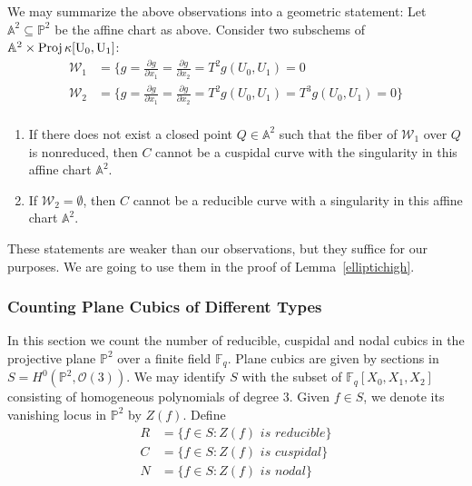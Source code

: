 \documentclass[12pt]{article}
\theoremstyle{plain}
\theoremstyle{definition}
\newcommand{\IA}{\mathbb{A}}
\newcommand{\IF}{\mathbb{F}}
\newcommand{\IP}{\mathbb{P}}
\newcommand{\sO}{\mathcal{O}}
\newcommand{\Proj}{\rm Proj\,}
\newcommand{\<}{\langle}
\renewcommand{\>}{\rangle}
\newcommand{\p}{\partial}
\newcommand{\sW}{\mathcal{W}}
\begin{document}
We may summarize the above observations into a geometric statement: Let $\IA^2 \subseteq \IP^2$ be the affine chart as above. Consider two subschems of $\IA^2 \times \Proj \kappa[U_0, U_1]$: 
\begin{align*}
\sW_1 &= \{ g = \frac{\p g}{\p x_1} = \frac{\p g}{\p x_2} = T^2 g(U_0, U_1) = 0 \\
\sW_2 &= \{ g = \frac{\p g}{\p x_1} = \frac{\p g}{\p x_2} = T^2 g(U_0, U_1) = T^3 g(U_0, U_1) = 0 \} \\
\end{align*} 
\begin{enumerate}
\item If there does not exist a closed point $Q \in \IA^2$ such that the fiber of $\sW_1$ over $Q$ is nonreduced, then $C$ cannot be a cuspidal curve with the singularity in this affine chart $\IA^2$. 
\item If $\sW_2 = \emptyset$, then $C$ cannot be a reducible curve with a singularity in this affine chart $\IA^2$. 
\end{enumerate}
These statements are weaker than our observations, but they suffice for our purposes. We are going to use them in the proof of Lemma~\ref{elliptichigh}. 


\subsubsection{Counting Plane Cubics of Different Types}
In this section we count the number of reducible, cuspidal and nodal cubics in the projective plane $\IP^2$ over a finite field $\IF_q$. Plane cubics are given by sections in $S = H^0(\IP^2, \sO(3))$. We may identify $S$ with the subset of $\IF_q[X_0, X_1, X_2]$ consisting of homogeneous polynomials of degree $3$. Given $f \in S$, we denote its vanishing locus in $\IP^2$ by $Z(f)$. Define 
\begin{align*}
R &= \{ f \in S : Z(f) \textit{ is reducible} \} \\
C &= \{ f \in S : Z(f) \textit{ is cuspidal} \} \\
N &= \{ f \in S : Z(f) \textit{ is nodal} \}
\end{align*}
\end{document}
